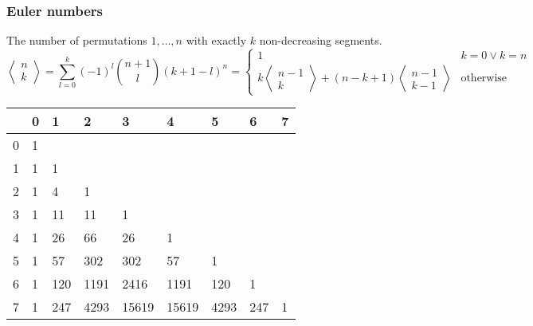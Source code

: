 \subsubsection{Euler numbers}

The number of permutations $1,\ldots, n$ with exactly $k$
non-decreasing segments.
\begin{equation*}
  \left\langle
    \begin{matrix}
      n\\k
    \end{matrix}
\right\rangle = \sum\limits_{l = 0}^k(-1)^l \binom{n + 1}{l}(k + 1 - l)^n
  =
  \begin{cases}
    1 & k = 0 \lor k = n\\
    k \left\langle
      \begin{smallmatrix}
        n - 1\\k
      \end{smallmatrix}
\right\rangle + (n - k + 1) \left\langle
  \begin{smallmatrix}
    n - 1\\k - 1
  \end{smallmatrix}
\right\rangle & \text{otherwise}
  \end{cases}
\end{equation*}

\begin{center}
	\begin{tabular}{ |l||l|l|l|l|l|l|l|l| } 
		\hline
		\diagbox{$n$}{$k$} & 0 & 1 & 2 & 3 & 4 & 5 & 6 & 7  \\
		\hline\hline
		0 &  1 &     &      &       &        &       &      &    \\
		1 &  1 & 1   &      &       &        &       &      &    \\
		2 &  1 & 4   & 1    &       &        &       &      &    \\
		3 &  1 & 11  & 11   & 1     &        &       &      &    \\
		4 &  1 & 26  & 66   & 26    & 1      &       &      &    \\
		5 &  1 & 57  & 302  & 302   & 57     & 1     &      &    \\
		6 &  1 & 120 & 1191 & 2416  & 1191   & 120   & 1    &    \\
		7 &  1 & 247 & 4293 & 15619 & 15619  & 4293  & 247  & 1  \\
		\hline
	\end{tabular}
\end{center}

